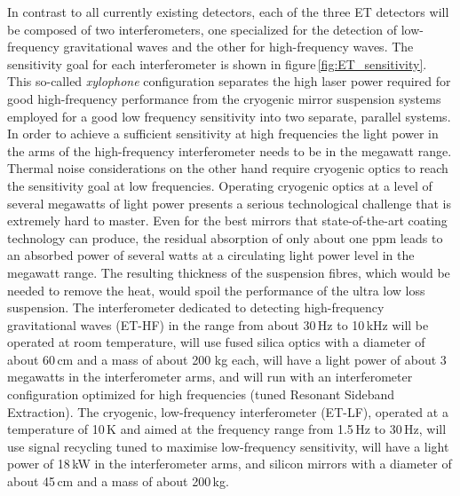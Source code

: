 In contrast to all currently existing detectors, each of the three ET detectors will be composed of two interferometers, one specialized for the detection of low-frequency gravitational waves and the other for high-frequency waves. The sensitivity goal for each interferometer is shown 
in figure\,\ref{fig:ET_sensitivity}. This so-called \textit{xylophone}
configuration separates the high laser power required for good high-frequency performance from the cryogenic mirror suspension systems employed for a good low frequency sensitivity into two separate, parallel systems.
In order to achieve a sufficient sensitivity at high frequencies the light power in the arms of the high-frequency interferometer needs to be in the megawatt range. Thermal noise considerations on the other hand require cryogenic optics to reach the sensitivity goal at low frequencies. 
Operating cryogenic optics at a level of several megawatts of light power presents a serious technological challenge that is extremely hard to master. 
Even for the best mirrors that state-of-the-art coating technology can produce, the residual absorption of only about one ppm leads to an absorbed power of several watts at a circulating light power level in the megawatt range. 
The resulting thickness of the suspension fibres, which would be needed to remove the heat, would spoil the performance of the ultra low loss suspension. 
The interferometer dedicated to detecting high-frequency gravitational waves (ET-HF) in the range from about 30\,Hz to 10\,kHz will be operated at room temperature, will use fused silica optics with a diameter of about 60\,cm and a mass of about 200 kg each, will have a light power of about 3\,megawatts in the interferometer arms, and will run with an interferometer configuration optimized for high frequencies (tuned Resonant Sideband Extraction). 
The cryogenic, low-frequency interferometer (ET-LF), operated at a temperature of 10\,K and aimed at the frequency range from 1.5\,Hz to 30\,Hz, will use signal recycling tuned to maximise low-frequency sensitivity, will have a light power of 18\,kW  in the interferometer arms, and silicon mirrors with a diameter of about 45\,cm and a mass of about 200\,kg. 
